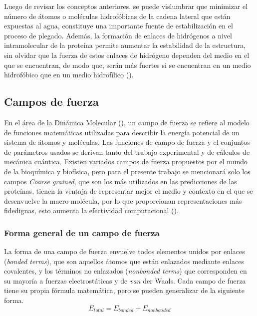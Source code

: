 Luego de revisar los conceptos anteriores, se puede vislumbrar que minimizar el número de átomos o moléculas hidrofóbicas de la cadena lateral que están expuestas al agua, constituye una importante fuente de estabilización en el proceso de plegado. Además, la formación de enlaces de hidrógenos a nivel intramolecular de la proteína permite aumentar la estabilidad de la estructura, sin olvidar que la fuerza de estos enlaces de hidrógeno dependen del medio en el que se encuentran, de modo que, serán más fuertes si se encuentran en un medio hidrofóbico que en un medio hidrofílico (\citealp{molecular:book}).

\subsection{Campos de fuerza}

En el área de la Dinámica Molecular (\citealp{Karplus10052005}), un campo de fuerza se refiere al modelo de funciones matemáticas utilizadas para describir la energía potencial de un sistema de átomos y moléculas. Las funciones de campo de fuerza y el conjuntos de parámetros usados se derivan tanto del trabajo experimental y de cálculos de mecánica cuántica. Existen variados campos de fuerza propuestos por el mundo de la bioquímica y biofísica, pero para el presente trabajo se mencionará solo los campos \textit{Coarse grained}, que son los más utilizados en las predicciones de las proteínas, tienen la ventaja de representar mejor el medio y contexto en el que se desenvuelve la macro-molécula, por lo que proporcionan representaciones más fidedignas, esto aumenta la efectividad computacional (\citealp{hornak:2006}).

\subsubsection{Forma general de un campo de fuerza}

La forma de una campo de fuerza envuelve todos elementos unidos por enlaces (\textit{bonded terms}), que son aquellos átomos que están enlazados mediante enlaces covalentes, y los términos no enlazados (\textit{nonbonded terms}) que corresponden en su mayoría a fuerzas electrostáticas y de \textit{van} der Waals. Cada campo de fuerza tiene su propia fórmula matemática, pero se pueden generalizar de la siguiente forma.
\begin{equation}
	E_{total}=E_{bonded}+E_{nonbonded}
\end{equation}

